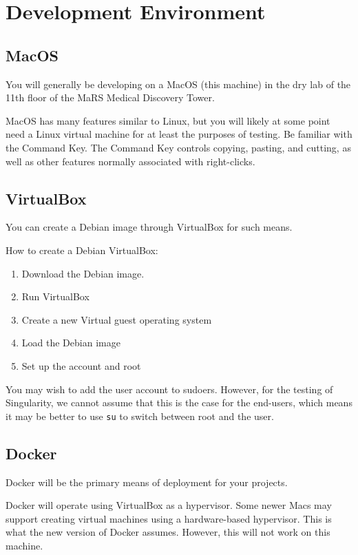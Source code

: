 \documentclass{article}
\begin{document}
\section{Development Environment}

\subsection{MacOS}

You will generally be developing on a MacOS (this machine) in the dry lab of the 11th floor
of the MaRS Medical Discovery Tower.

MacOS has many features similar to Linux, but you will likely
at some point need a Linux virtual machine for at least
the purposes of testing. Be familiar with the Command Key. The Command Key controls copying, pasting, and cutting, as well as other features normally associated with right-clicks.

\subsection{VirtualBox}

You can create a Debian image through VirtualBox for such means.

How to create a Debian VirtualBox:
\begin{enumerate}
\item Download the Debian image.
\item Run VirtualBox
\item Create a new Virtual guest operating system
\item Load the Debian image
\item Set up the account and root
\end{enumerate}
You may wish to add the user account to sudoers. 
However, for the testing of Singularity, we cannot assume
that this is the case for the end-users, which means
it may be better to use \texttt{su} to switch between root 
and the user.

\subsection{Docker}

Docker will be the primary means of deployment for your projects.

Docker will operate using VirtualBox as a hypervisor.
Some newer Macs may support creating virtual machines using a
hardware-based hypervisor. This is what the new version of Docker
assumes. However, this will not work on this machine.
\end{document}
